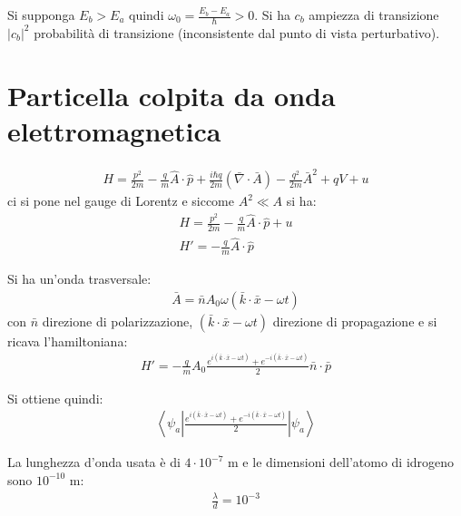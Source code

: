 Si supponga $E_b>E_a$ quindi $\omega _0=\frac{E_b-E_a}{\hbar }>0$. Si ha $c_b$ ampiezza di transizione
$\left|c_b\right|^2$ probabilità di transizione (inconsistente dal punto di vista perturbativo).

\section{Particella colpita da onda elettromagnetica} %
\begin{equation}\begin{split}
H=\frac{p^2}{2m}-\frac{q}{m}\hat A\cdot \hat p+\frac{i\hbar q}{2m}\left(\bar \nabla \cdot \bar A\right)-\frac{q^2}{2m}\bar A^2+qV+u
\end{split}\end{equation}
ci si pone nel gauge di Lorentz e siccome $A^2\ll A$ si ha:
\begin{equation}\begin{split}
H=\frac{p^2}{2m}-\frac{q}{m}\hat A\cdot \hat p+u\\
H'=-\frac{q}{m}\hat A\cdot \hat p
\end{split}\end{equation}

Si ha un'onda trasversale:
\begin{equation}\begin{split}
\bar A=\bar n A_0\omega \left(\bar k\cdot \bar x-\omega t\right)
\end{split}\end{equation}
con $\bar n$ direzione di polarizzazione, $\left(\bar k\cdot \bar x-\omega t\right)$ direzione di propagazione e si ricava l'hamiltoniana:
\begin{equation}\begin{split}
H'=-\frac{q}{m}A_0\frac{e^{i\left(\bar k\cdot \bar x-\omega t\right)}+e^{-i\left(\bar k\cdot \bar x-\omega t\right)}}{2}\bar n\cdot \bar p
\end{split}\end{equation}

Si ottiene quindi:
\begin{equation}\begin{split}
\left\langle \psi _a\left|\frac{e^{i\left(\bar k\cdot \bar x-\omega t\right)}+e^{-i\left(\bar k\cdot \bar x-\omega t\right)}}{2}\right|\psi _a \right\rangle
\end{split}\end{equation}

La lunghezza d'onda usata è di $4\cdot 10^{-7}$ m e le dimensioni dell'atomo di idrogeno sono $10^{-10}$ m:
\begin{equation}\begin{split}
\frac{\lambda}{d}=10^{-3}
\end{split}\end{equation}

